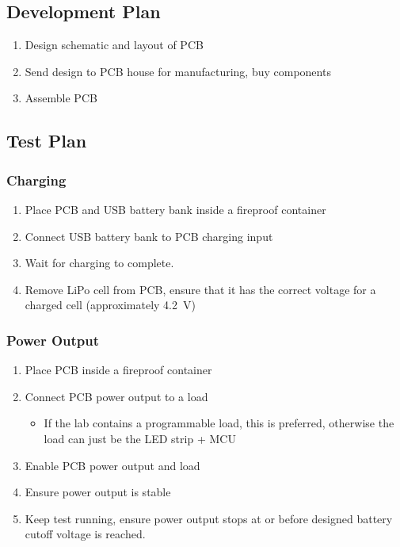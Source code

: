 \documentclass{notes}
\begin{document}
\subsection{Development Plan}

\begin{enumerate}
    \item Design schematic and layout of PCB
    \item Send design to PCB house for manufacturing, buy components
    \item Assemble PCB
\end{enumerate}

\subsection{Test Plan}

\subsubsection{Charging}

\begin{enumerate}
    \item Place PCB and USB battery bank inside a fireproof container
    \item Connect USB battery bank to PCB charging input
    \item Wait for charging to complete.
    \item Remove LiPo cell from PCB, ensure that it has the correct voltage for a charged cell (approximately \SI{4.2}{\volt})
\end{enumerate}

\subsubsection{Power Output}

\begin{enumerate}
    \item Place PCB inside a fireproof container
    \item Connect PCB power output to a load
          \begin{itemize}
              \item If the lab contains a programmable load, this is preferred, otherwise the load can just be the LED strip + MCU
          \end{itemize}
    \item Enable PCB power output and load
    \item Ensure power output is stable
    \item Keep test running, ensure power output stops at or before designed battery cutoff voltage is reached.
\end{enumerate}
\end{document}
